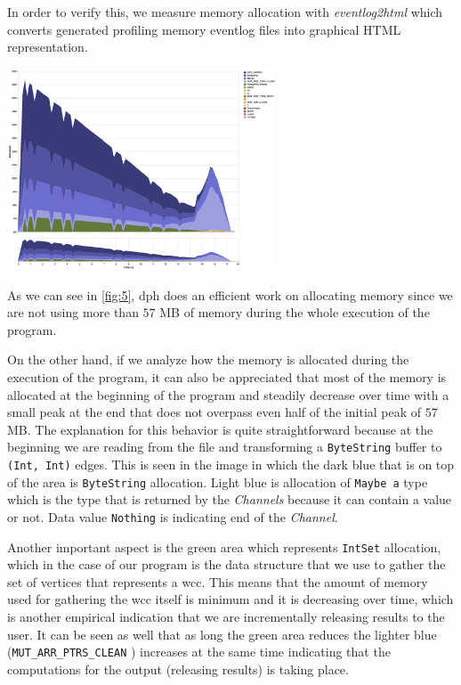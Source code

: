 \documentclass[preprint]{elsarticle}
\begin{document}
In order to verify this, we measure memory allocation with \textit{eventlog2html} \cite{eventlog2html} which converts generated profiling memory eventlog files into graphical HTML representation. 

\begin{minipage}[t]{\linewidth}
\begin{center}
  \includegraphics[width=0.6\textwidth]{visualization}
  \captionsetup{type=figure}
  \label{fig:5}
  \end{center}
\end{minipage}

As we can see in \autoref{fig:5}, \acrshort{dph} does an efficient work on allocating memory since we are not using more than $57$ MB of memory during the whole execution of the program.

On the other hand, if we analyze how the memory is allocated during the execution of the program, it can also be appreciated that most of the memory is allocated at the beginning of the program and steadily decrease over time with a small peak at the end that does not overpass even half of the initial peak of $57$ MB. The explanation for this behavior is quite straightforward because at the beginning we are reading from the file and transforming a \texttt{ByteString} buffer to \texttt{(Int, Int)} edges. This is seen in the image in which the dark blue that is on top of the area is \texttt{ByteString} allocation. Light blue is allocation of \texttt{Maybe a} type which is the type that is returned by the \textit{Channels} because it can contain a value or not. Data value \texttt{Nothing} is indicating end of the \textit{Channel}. 

Another important aspect is the green area which represents \texttt{IntSet} allocation, which in the case of our program is the data structure that we use to gather the set of vertices that represents a \acrshort{wcc}. This means that the amount of memory used for gathering the \acrshort{wcc} itself is minimum and it is decreasing over time, which is another empirical indication that we are incrementally releasing results to the user. It can be seen as well that as long the green area reduces the lighter blue (\texttt{MUT_ARR_PTRS_CLEAN} \cite{ghcheap}) increases at the same time indicating that the computations for the output (releasing results) is taking place. 
\end{document}
